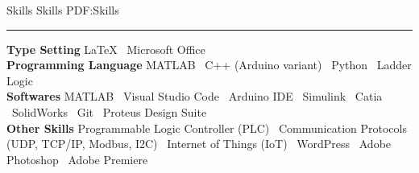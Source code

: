 \documentclass[letterpaper,MMMyyyy]{CVTemplate}
\begin{document}
\begin{Body}
\Section
{Skills}
{Skills}
{PDF:Skills}
\textcolor{Forestg}{\vspace{0.10cm}\hrule height 0.1cm}\BigGap\Gap
\BulletItem
\textbf{Type Setting}
\newline
{\LaTeX} \textbullet\ Microsoft Office
\\
\vspace{6pt}
\BulletItem
\textbf{Programming Language}
\newline
MATLAB \textbullet\ 
C++ (Arduino variant) \textbullet\ 
Python \textbullet\ 
Ladder Logic
\\
\vspace{6pt}
\BulletItem
\textbf{Softwares}
\newline
MATLAB \textbullet\ 
Visual Studio Code \textbullet\ 
Arduino IDE \textbullet\ 
Simulink \textbullet\ 
Catia \textbullet\
SolidWorks \textbullet\
Git \textbullet\
Proteus Design Suite\\
\vspace{6pt}
%
\vspace{6pt}
\BulletItem
\textbf{Other Skills}
\newline
 Programmable Logic Controller (PLC)
\textbullet\ Communication Protocols (UDP, TCP/IP, Modbus, I2C) 
\textbullet\ Internet of Things (IoT)
\textbullet\ WordPress 
\textbullet\ Adobe Photoshop 
\textbullet\ Adobe Premiere 


\end{Body}
\end{document}
